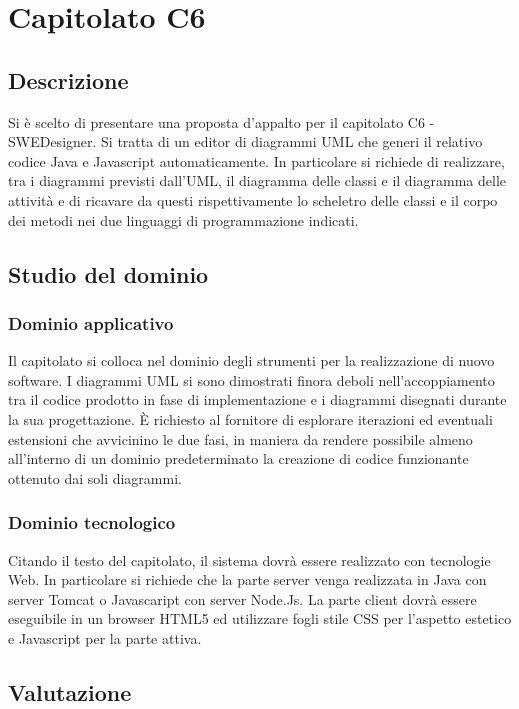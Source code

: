 \documentclass[../StudioDiFattibilita.tex]{subfiles}
\begin{document}
	\section{Capitolato C6}
		\subsection{Descrizione}
		Si è scelto di presentare una proposta d'appalto per il capitolato C6 - SWEDesigner.
		Si tratta di un editor di diagrammi UML che generi il relativo codice Java e Javascript automaticamente.
		In particolare si richiede di realizzare, tra i diagrammi previsti dall'UML, il diagramma delle classi e il diagramma delle attività 
		e di ricavare da questi rispettivamente lo scheletro delle classi e il corpo dei metodi nei due linguaggi di programmazione
		indicati.
		\subsection{Studio del dominio}
			\subsubsection{Dominio applicativo}
			Il capitolato si colloca nel dominio degli strumenti per la realizzazione di nuovo software.
			I diagrammi UML si sono dimostrati finora deboli nell'accoppiamento tra il codice prodotto in fase di implementazione e 
			i diagrammi disegnati durante la sua progettazione. È richiesto al fornitore di esplorare iterazioni ed eventuali 
			estensioni che avvicinino le due fasi, in maniera da rendere possibile almeno all'interno di un dominio predeterminato
			la creazione di codice funzionante ottenuto dai soli diagrammi.
			\subsubsection{Dominio tecnologico}
			Citando il testo del capitolato, il sistema dovrà essere realizzato con tecnologie Web.
			In particolare si richiede che la parte server venga realizzata in Java con server Tomcat o Javascaript con server
			Node.Js. La parte client dovrà essere eseguibile in un browser HTML5 ed utilizzare fogli stile CSS per l’aspetto 
			estetico e Javascript per la parte attiva.
		\subsection{Valutazione}
\end{document}
